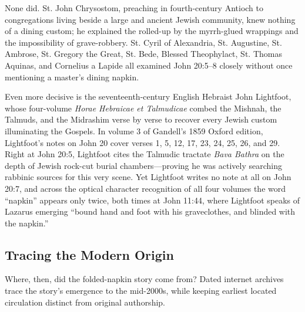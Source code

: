 None did. St. John Chrysostom, preaching in fourth-century Antioch to congregations living beside a large and ancient Jewish community, knew nothing of a dining custom; he explained the rolled-up  by the myrrh-glued wrappings and the impossibility of grave-robbery. St. Cyril of Alexandria, St. Augustine, St. Ambrose, St. Gregory the Great, St. Bede, Blessed Theophylact, St. Thomas Aquinas, and Cornelius a Lapide all examined John 20:5--8 closely without once mentioning a master's dining napkin.

Even more decisive is the seventeenth-century English Hebraist John Lightfoot, whose four-volume \emph{Horae Hebraicae et Talmudicae} combed the Mishnah, the Talmuds, and the Midrashim verse by verse to recover every Jewish custom illuminating the Gospels. In volume 3 of Gandell's 1859 Oxford edition, Lightfoot's notes on John 20 cover verses 1, 5, 12, 17, 23, 24, 25, 26, and 29. Right at John 20:5, Lightfoot cites the Talmudic tractate \emph{Bava Bathra} on the depth of Jewish rock-cut burial chambers---proving he was actively searching rabbinic sources for this very scene. Yet Lightfoot writes no note at all on John 20:7, and across the optical character recognition of all four volumes the word ``napkin'' appears only twice, both times at John 11:44, where Lightfoot speaks of Lazarus emerging ``bound hand and foot with his graveclothes, and blinded with the napkin.''

\subsection{Tracing the Modern Origin}

Where, then, did the folded-napkin story come from? Dated internet archives trace the story's emergence to the mid-2000s, while keeping earliest located circulation distinct from original authorship.

